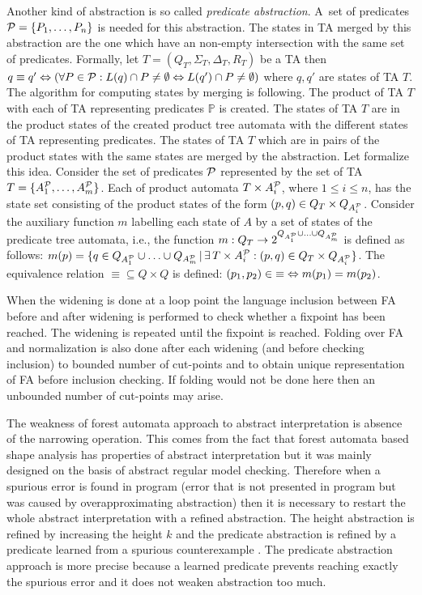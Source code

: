 \documentclass[a4paper, 12pt]{article}
\begin{document}
Another kind of abstraction is so called \emph{predicate abstraction}.
A~set of predicates $\predset=\{\pred_1, \ldots, \pred_n\}$ is needed for this abstraction.
The states in TA merged by this abstraction are the one which have an non-empty
intersection with the same set of predicates.
Formally, let $T=(Q_T, \Sigma_T, \Delta_T, R_T)$ be a TA then $q \equiv q' \defarrow
(\forall \pred \in \predset: \langstate{T}{q} \cap \pred \neq \emptyset
\Leftrightarrow \langstate{T}{q'} \cap \pred \neq \emptyset)$
where $q,q'$ are states of TA $T$.
The algorithm for computing states by merging is following.
The product of TA $T$ with each of TA representing predicates $\mathbb{P}$ is created.
The states of TA $T$ are in the product states of the created
product tree automata with the different states of TA representing predicates.
The states of TA $T$ which are in pairs of the product states with
the same states are merged by the abstraction.
Let formalize this idea.
Consider the set of predicates $\predset$ represented by the set of TA
$T=\{\predauti{1}, \ldots, \predauti{m}\}$.
Each of product automata $T \times \predauti{i}$, where $1 \leq i \leq n$, has the state set
consisting of the product states of the form $(p,q) \in Q_T \times Q_{\predauti{i}}$.
Consider the auxiliary function $m$ labelling
each state of $A$ by a set of states of the predicate tree automata,
i.e., the function $m: Q_T \rightarrow 2^{Q_{\predauti{1}} \cup \ldots
\cup Q_{\predauti{m}}}$ is defined as follows: $m(p) = \{q \in Q_{\predauti{1}} \cup \ldots \cup Q_{\predauti{m}}\,|\,
\exists\,T\times\predauti{i}: (p,q) \in Q_{T} \times Q_{\predauti{i}}\}$.
The equivalence relation ${\equiv} \subseteq {Q \times Q}$ is defined:
${(p_1,p_2)} \in {\equiv} \defarrow m(p_1) = m(p_2)$.

When the widening is done at a loop point the language inclusion between
FA before and after widening is performed to check whether a fixpoint has been reached.
The widening is repeated until the fixpoint is reached.
Folding over FA and normalization is also done after each widening (and
before checking inclusion) to bounded number of cut-points
and to obtain unique representation of FA before inclusion checking.
If folding would not be done here then an unbounded number of cut-points
may arise.

The weakness of forest automata approach to abstract interpretation is absence of
the narrowing operation.
This comes from the fact that forest automata based shape analysis has properties
of abstract interpretation but it was mainly designed on the basis of abstract
regular model checking.
Therefore when a spurious error is found in program (error that is not presented in
program but was caused by overapproximating abstraction) then it is necessary
to restart the whole abstract interpretation with a refined abstraction.
The height abstraction is refined by increasing the height $k$ and the predicate
abstraction is refined by a predicate learned from a spurious counterexample \cite{mt:hruska}.
The predicate abstraction approach is more precise because
a learned predicate prevents reaching exactly the spurious error and
it does not weaken abstraction too much.
\end{document}
